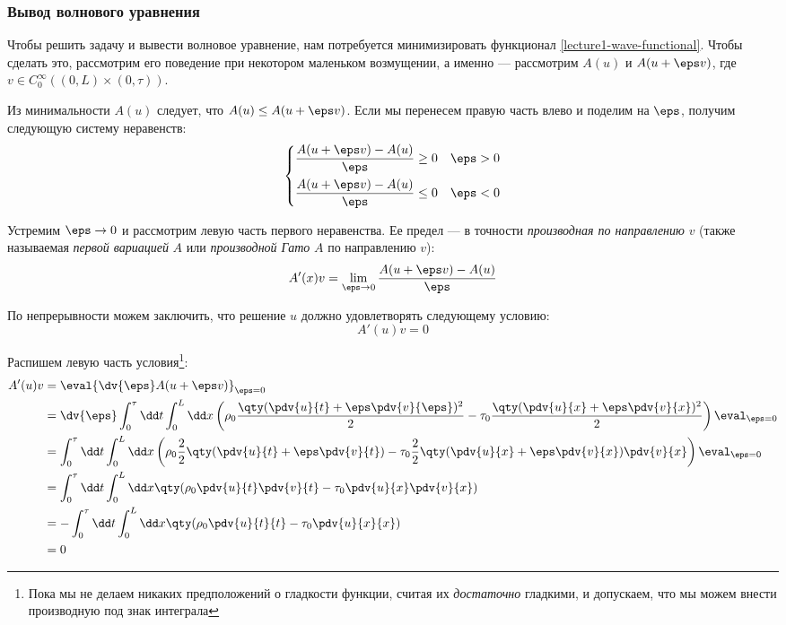
\subsubsection{Вывод волнового уравнения}

Чтобы решить задачу и вывести волновое уравнение, нам потребуется минимизировать функционал \eqref{lecture1-wave-functional}. Чтобы сделать это, рассмотрим его поведение при некотором маленьком возмущении, а именно --- рассмотрим $A(u)$ и $A(u + \eps v)$, где $v \in C_0^\infty \left((0, L) \times (0, \tau) \right)$.

Из минимальности $A(u)$ следует, что $A(u) \le A(u + \eps v)$. Если мы перенесем правую часть влево и поделим на $\eps$, получим следующую систему неравенств:
%
\begin{equation*}
  \left\{\begin{aligned}
    \frac{A(u + \eps v) - A(u)}{\eps} &\ge 0 && \eps > 0 \\
    \frac{A(u + \eps v) - A(u)}{\eps} &\le 0 && \eps < 0
  \end{aligned}\right.
\end{equation*}

Устремим $\eps \to 0$ и рассмотрим левую часть первого неравенства. Ее предел --- в точности \emph{производная по направлению} $v$ (также называемая \emph{первой вариацией} $A$ или \emph{производной Гато} $A$ по направлению $v$):
\begin{equation*}
  A'(x)v = \lim\limits_{\eps \to 0} \frac{A(u + \eps v) - A(u)}{\eps}
\end{equation*}

По непрерывности можем заключить, что решение $u$ должно удовлетворять следующему условию:
\begin{equation}
  \boxed{A'(u)v = 0}
  \label{lecture2-wave-necessary}
\end{equation}

Распишем левую часть условия\footnote{Пока мы не делаем никаких предположений о гладкости функции, считая их \emph{достаточно} гладкими, и допускаем, что мы можем внести производную под знак интеграла}:
%
\begin{equation*}
  \begin{aligned}
    A'(u)v
    &= \eval{\dv{\eps} A(u + \eps v)}_{\eps = 0} \\  
    &= \dv{\eps} \int_0^\tau \dd t \int_0^L \dd x \left(\rho_0 \frac{\qty(\pdv{u}{t} + \eps \pdv{v}{\eps})^2}{2} - \tau_0
     \frac{\qty(\pdv{u}{x} + \eps \pdv{v}{x})^2}{2}\right) \eval_{\eps = 0} \\
    &= \int_0^\tau \dd t \int_0^L \dd x \left( \rho_0 \frac{2}{2} \qty(\pdv{u}{t} + \eps \pdv{v}{t}) - \tau_0 \frac{2}{2} \qty(\pdv{u}{x} + \eps \pdv{v}{x}) \pdv{v}{x} \right) \eval_{\eps=0} \\
    &= \int_0^\tau \dd t \int_0^L \dd x \qty(\rho_0 \pdv{u}{t} \pdv{v}{t} - \tau_0 \pdv{u}{x} \pdv{v}{x}) \\
    &= -\int_0^\tau \dd t \int_0^L \dd x \qty(\rho_0 \pdv{u}{t}{t} - \tau_0 \pdv{u}{x}{x}) \\
    &= 0
  \end{aligned}
\end{equation*}

